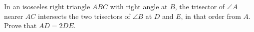 In an isosceles right triangle $ABC$ with right angle at $B$, the trisector of $\angle A$ nearer $AC$ intersects the two trisectors of $\angle B$ at $D$ and $E$, in that order from $A$. Prove that $AD=2DE$.
